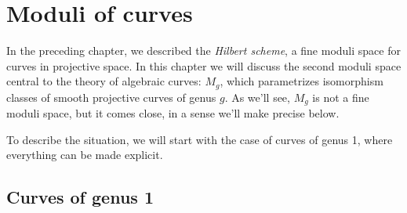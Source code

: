 


\chapter{Moduli of curves} 
\label{CurvesModuli chapter}\label{CurvesModuliChapter}


In the preceding chapter, we described the \emph{Hilbert scheme}, a fine moduli space for curves in projective space. In
this chapter we will discuss the second moduli space central to the theory of algebraic curves: $M_g$, which parametrizes isomorphism classes of smooth projective curves of genus $g$. As we'll see, $M_g$ is not a fine moduli space, but it comes close, in a sense we'll make precise below.



To describe the situation,  we will start with the case of curves of genus 1, where everything can be made explicit.


\section{Curves of genus 1}

